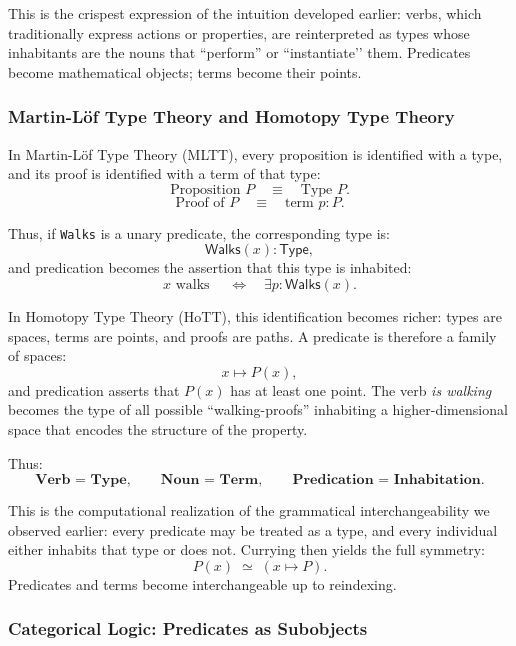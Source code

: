 \documentclass[12pt,letterpaper]{article}
\begin{document}
This is the crispest expression of the intuition developed earlier: verbs, which
traditionally express actions or properties, are reinterpreted as types whose
inhabitants are the nouns that ``perform'' or ``instantiate’’ them.  Predicates
become mathematical objects; terms become their points.

\subsubsection*{Martin-Löf Type Theory and Homotopy Type Theory}

In Martin-Löf Type Theory (MLTT), every proposition is identified with a type,
and its proof is identified with a term of that type:
\[
\text{Proposition } P \quad \equiv \quad \text{Type } P.
\]
\[
\text{Proof of } P \quad \equiv \quad \text{term } p : P.
\]

Thus, if \texttt{Walks} is a unary predicate, the corresponding type is:
\[
\mathsf{Walks}(x) : \mathsf{Type},
\]
and predication becomes the assertion that this type is inhabited:
\[
x \text{ walks } \quad\Longleftrightarrow\quad \exists p : \mathsf{Walks}(x).
\]

In Homotopy Type Theory (HoTT), this identification becomes richer: types are
spaces, terms are points, and proofs are paths.  A predicate is therefore a
family of spaces:
\[
x \mapsto P(x),
\]
and predication asserts that $P(x)$ has at least one point.  The verb \emph{is
walking} becomes the type of all possible ``walking-proofs'' inhabiting a
higher-dimensional space that encodes the structure of the property.

Thus:
\[
\textbf{Verb = Type}, \qquad \textbf{Noun = Term}, \qquad \textbf{Predication = Inhabitation}.
\]

This is the computational realization of the grammatical interchangeability we
observed earlier: every predicate may be treated as a type, and every individual
either inhabits that type or does not.  Currying then yields the full symmetry:
\[
P(x) \;\simeq\; (x \mapsto P).
\]
Predicates and terms become interchangeable up to reindexing.

\subsubsection*{Categorical Logic: Predicates as Subobjects}
\end{document}
